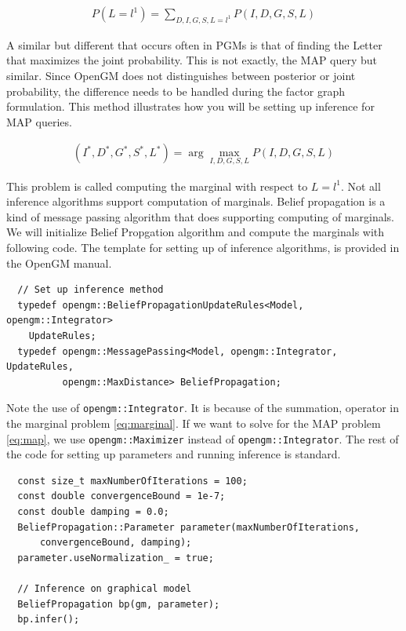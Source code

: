 \documentclass[12pt,oneside,letterpaper]{article}
\begin{document}
\begin{align}
  P(L = l^1) = \sum_{D,I,G,S,L=l^1} P(I, D, G, S, L)
  \label{eq:marginal}
\end{align}

A similar but different that occurs often in PGMs is that of finding the Letter
that maximizes the joint probability. This is not exactly, the MAP query but
similar. Since OpenGM does not distinguishes between posterior or joint
probability, the difference needs to be handled during the factor graph
formulation. This method illustrates how you will be setting up inference for
MAP queries. 

\begin{align}
  (I^*, D^*, G^*, S^*, L^*)  = \arg \max_{I, D, G, S, L} P(I, D, G, S, L)
  \label{eq:map}
\end{align}

This problem is called computing the marginal with respect to $L = l^1$. Not
all inference algorithms support computation of marginals. Belief propagation
is a kind of message passing algorithm that does supporting computing of
marginals. We will initialize Belief Propgation algorithm and compute the
marginals with following code. The template for setting up of inference
algorithms, is provided in the OpenGM manual. 

\begin{lstlisting}
  // Set up inference method
  typedef opengm::BeliefPropagationUpdateRules<Model, opengm::Integrator>
    UpdateRules;
  typedef opengm::MessagePassing<Model, opengm::Integrator, UpdateRules,
          opengm::MaxDistance> BeliefPropagation;
\end{lstlisting}

Note the use of \lstinline|opengm::Integrator|. It is because of the summation,
operator in the marginal problem \eqref{eq:marginal}. If we want to
solve for the MAP problem \eqref{eq:map}, we use \lstinline|opengm::Maximizer| 
instead of \lstinline|opengm::Integrator|. The rest of the code for setting up parameters and running inference is standard.

\begin{lstlisting}
  const size_t maxNumberOfIterations = 100;
  const double convergenceBound = 1e-7;
  const double damping = 0.0;
  BeliefPropagation::Parameter parameter(maxNumberOfIterations,
      convergenceBound, damping);
  parameter.useNormalization_ = true;

  // Inference on graphical model
  BeliefPropagation bp(gm, parameter);
  bp.infer();

\end{lstlisting}
\end{document}
